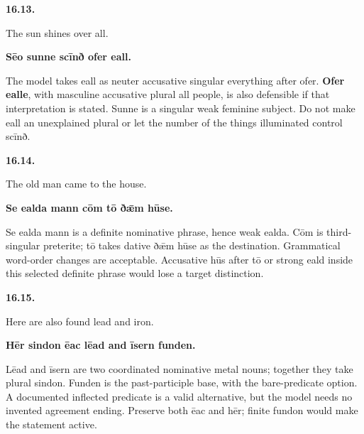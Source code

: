 \par\begin{minipage}{\linewidth}\raggedright
\textbf{16.13.}

The sun shines over all.

\textbf{Sēo sunne scīnð ofer eall.}

The model takes eall as neuter accusative singular everything after ofer. \textbf{Ofer ealle}, with masculine accusative plural all people, is also defensible if that interpretation is stated. Sunne is a singular weak feminine subject. Do not make eall an unexplained plural or let the number of the things illuminated control scīnð.

\end{minipage}\par\addvspace{4pt}

\par\begin{minipage}{\linewidth}\raggedright
\textbf{16.14.}

The old man came to the house.

\textbf{Se ealda mann cōm tō ðǣm hūse.}

Se ealda mann is a definite nominative phrase, hence weak ealda. Cōm is third-singular preterite; tō takes dative ðǣm hūse as the destination. Grammatical word-order changes are acceptable. Accusative hūs after tō or strong eald inside this selected definite phrase would lose a target distinction.

\end{minipage}\par\addvspace{4pt}

\par\begin{minipage}{\linewidth}\raggedright
\textbf{16.15.}

Here are also found lead and iron.

\textbf{Hēr sindon ēac lēad and īsern funden.}

Lēad and īsern are two coordinated nominative metal nouns; together they take plural sindon. Funden is the past-participle base, with the bare-predicate option. A documented inflected predicate is a valid alternative, but the model needs no invented agreement ending. Preserve both ēac and hēr; finite fundon would make the statement active.

\end{minipage}\par\addvspace{4pt}

